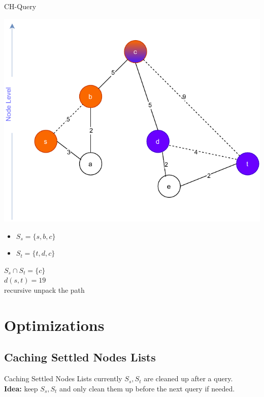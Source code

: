 \documentclass[8pt, t, aspectratio=169]{beamer}
\begin{document}
\begin{huge}
\begin{frame}{CH-Query}
  \begin{minipage}{0.54\textwidth}
    \includegraphics[width=1.0\textwidth]{query2.pdf}
  \end{minipage}
  \pause
  \begin{minipage}{0.44\textwidth}
    \begin{itemize}
    \item $S_s = \{s, b, c\}$
    \item $S_t = \{t, d, c\}$
    \end{itemize}
    \pause
    \Rightarrow $S_s \cap S_t = \{c\}$\\
    \pause
    \Rightarrow $d(s,t)= 19$\\
    \pause
    \Rightarrow recursive unpack the path
  \end{minipage}
\end{frame}
		
\section{Optimizations}
\subsection{Caching Settled Nodes Lists}
\begin{frame}{Caching Settled Nodes Lists}
  \vfill
  \pause
  currently $S_s, S_t$ are cleaned up after a query. \\
  \pause
  \textbf{Idea:} keep $S_s, S_t$ and only clean them up before the next query if needed.


\end{frame}
\end{huge}
\end{document}
